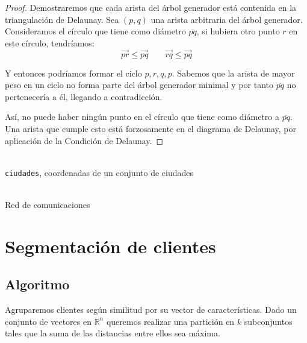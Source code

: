 \documentclass[a4paper, 11pt]{article} %
\begin{document}
    \begin{proof}
      Demostraremos que cada arista del árbol generador está contenida en la triangulación de Delaunay.
      Sea $(p,q)$ una arista arbitraria del árbol generador. 
      Consideramos el círculo que tiene como diámetro $\overline{pq}$, si hubiera otro punto $r$ en este círculo, tendríamos:
      \begin{equation}
       \overrightarrow{pr} \leq \overrightarrow{pq} \qquad \overrightarrow{rq} \leq \overrightarrow{pq}
      \end{equation}

      Y entonces podríamos formar el ciclo $p,r,q,p$. Sabemos que la arista de mayor peso en un ciclo no forma parte del árbol generador minimal y por tanto $\overline{pq}$
      no pertenecería a él, llegando a contradicción.

      Así, no puede haber ningún punto en el círculo que tiene como diámetro a $\overline{pq}$. Una arista que cumple esto está forzosamente en el diagrama de Delaunay,
      por aplicación de la Condición de Delaunay.
    \end{proof}
    
    
    \begin{algorithm}[H]
	\begin{algorithmic}[1]
		\REQUIRE \ \\
        	\texttt{ciudades}, coordenadas de un conjunto de ciudades \\\
		\RETURN{$Kruskal(\texttt{grafo})$}
	\end{algorithmic}
      \caption{Red de comunicaciones}
      \label{red}
    \end{algorithm}
    
\section{Segmentación de clientes}
  \subsection{Algoritmo}
    Agruparemos clientes según similitud por su vector de características. Dado un conjunto de vectores en $\mathbb{R}^n$
    queremos realizar una partición en $k$ subconjuntos tales que la suma de las distancias entre ellos sea máxima.
    
\end{document}
